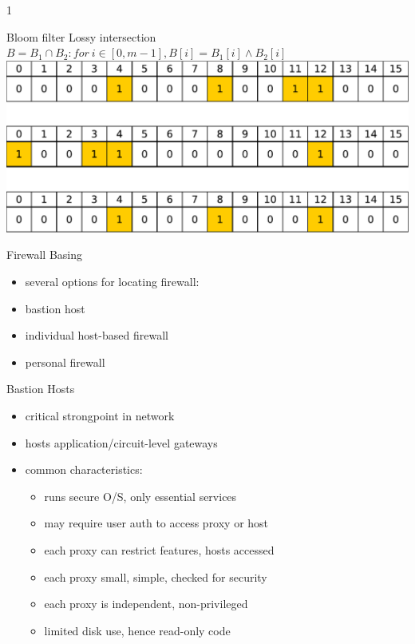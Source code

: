 1\documentclass{beamer}
\begin{document}
\begin{frame}[t]{Bloom filter}
{  }
   {
  Lossy intersection\\
  $B = B_1 \cap B_2: for\ i \in [0,m-1], B[i] = B_1[i] \wedge B_2[i]$\\
  \includegraphics[width=0.8\linewidth]{bloom4}
  }
\end{frame}


\begin{frame}{Firewall Basing}
  \begin{itemize}
  \item several options for locating firewall: 
  \item bastion host 
  \item individual host-based firewall 
  \item personal firewall
  \end{itemize}
\end{frame}

\begin{frame}{Bastion Hosts}
  \begin{itemize}
  \item critical strongpoint in network 
  \item hosts application/circuit-level gateways 
  \item common characteristics: 
    \begin{itemize}
    \item runs secure O/S, only essential services 
    \item may require user auth to access proxy or host 
    \item each proxy can restrict features, hosts accessed 
    \item each proxy small, simple, checked for security 
    \item each proxy is independent, non-privileged 
    \item limited disk use, hence read-only code 
    \end{itemize}
  \end{itemize}
\end{frame}
\end{document}
